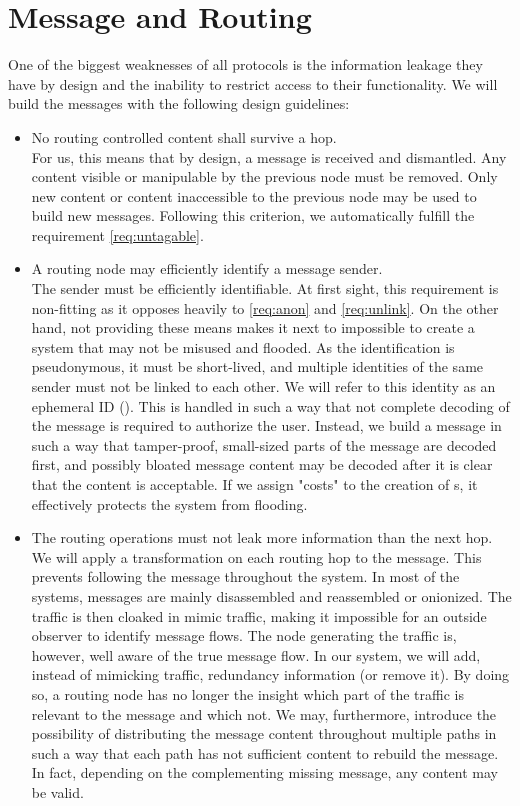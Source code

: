 \section{Message and Routing}
One of the biggest weaknesses of all protocols is the information leakage they have by design and the inability to restrict access to their functionality. We will build the messages with the following design guidelines:
\begin{itemize}
	\item No routing controlled content shall survive a hop.\\
	For us, this means that by design, a message is received and dismantled. Any content visible or manipulable by the previous node must be removed. Only new content or content inaccessible to the previous node may be used to build new messages. Following this criterion, we automatically fulfill the requirement \ref{req:untagable}.
	\item A routing node may efficiently identify a message sender.\\      
	The sender must be efficiently identifiable. At first sight, this requirement is non-fitting as it opposes heavily to \ref{req:anon} and \ref{req:unlink}. On the other hand, not providing these means makes it next to impossible to create a system that may not be misused and flooded. As the identification is pseudonymous, it must be short-lived, and multiple identities of the same sender must not be linked to each other. We will refer to this identity as an ephemeral ID (). This  is handled in such a way that not complete decoding of the message is required to authorize the user. Instead, we build a message in such a way that tamper-proof, small-sized parts of the message are decoded first, and possibly bloated message content may be decoded after it is clear that the content is acceptable. If we assign "costs" to the creation of s, it effectively protects the system from flooding.
	\item The routing operations must not leak more information than the next hop.\\
	We will apply a transformation on each routing hop to the message. This prevents following the message throughout the system. In most of the systems, messages are mainly disassembled and reassembled or onionized. The traffic is then cloaked in mimic traffic, making it impossible for an outside observer to identify message flows. The node generating the traffic is, however, well aware of the true message flow. In our system, we will add, instead of mimicking traffic, redundancy information (or remove it). By doing so, a routing node has no longer the insight which part of the traffic is relevant to the message and which not. We may, furthermore, introduce the possibility of distributing the message content throughout multiple paths in such a way that each path has not sufficient content to rebuild the message. In fact, depending on the complementing missing message, any content may be valid. 

\end{itemize}
